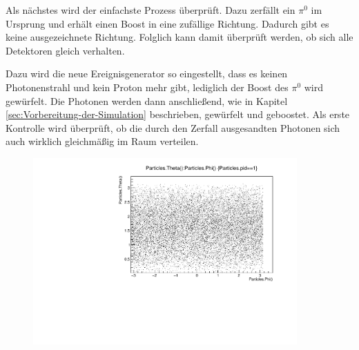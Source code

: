 \documentclass[a4paper,11pt,oneside,final,german,openbib,pdftex]{scrbook}
\begin{document}
{Als n\"achstes wird der einfachste Prozess \"uberpr\"uft. Dazu zerf\"allt ein $\pi^0$ im Ursprung und erh\"alt einen Boost in eine zufällige Richtung. Dadurch gibt es keine ausgezeichnete Richtung. Folglich kann damit überprüft werden, ob sich alle Detektoren gleich verhalten. 

Dazu wird die neue Ereignisgenerator so eingestellt, dass es keinen Photonenstrahl und kein Proton mehr gibt, lediglich der Boost des $\pi^0$ wird gewürfelt. Die Photonen werden dann anschließend, wie in Kapitel \ref{sec:Vorbereitung-der-Simulation} beschrieben, gewürfelt und geboostet. 
Als erste Kontrolle wird \"uberpr\"uft, ob die durch den Zerfall ausgesandten Photonen sich auch wirklich gleichm\"a{\ss}ig im Raum verteilen.


\begin{figure}[h!]
\centering
\begin{minipage}{0.45\textwidth}
\centering
		\includegraphics[width=0.9\textwidth]{20171005Pi0UrsprungThetaPhiVerteilung}
		

\end{minipage}
\end{figure}}
\end{document}
